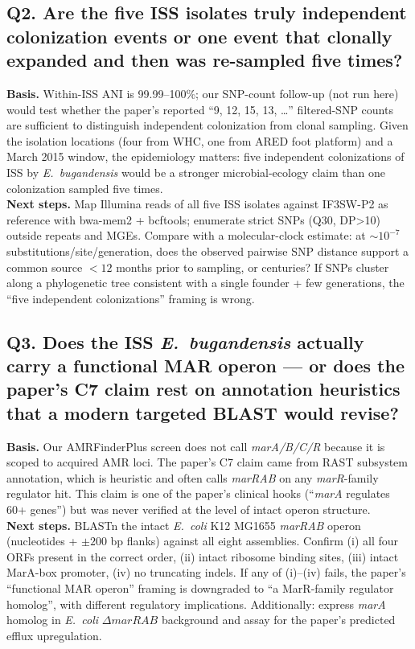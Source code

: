 \subsection*{Q2. Are the five ISS isolates truly independent colonization events or one
event that clonally expanded and then was re-sampled five times?}
\textbf{Basis.} Within-ISS ANI is 99.99--100\%; our SNP-count follow-up (not run here)
would test whether the paper's reported ``9, 12, 15, 13, \dots'' filtered-SNP counts are
sufficient to distinguish independent colonization from clonal sampling. Given the isolation
locations (four from WHC, one from ARED foot platform) and a March 2015 window, the
epidemiology matters: five independent colonizations of ISS by \emph{E.\ bugandensis} would
be a stronger microbial-ecology claim than one colonization sampled five times. \\
\textbf{Next steps.} Map Illumina reads of all five ISS isolates against IF3SW-P2 as
reference with bwa-mem2 + bcftools; enumerate strict SNPs (Q30, DP\textgreater 10) outside
repeats and MGEs. Compare with a molecular-clock estimate: at $\sim 10^{-7}$
substitutions/site/generation, does the observed pairwise SNP distance support a common
source $<12$ months prior to sampling, or centuries? If SNPs cluster along a phylogenetic
tree consistent with a single founder + few generations, the ``five independent
colonizations'' framing is wrong.

\subsection*{Q3. Does the ISS \emph{E.\ bugandensis} actually carry a functional MAR
operon --- or does the paper's C7 claim rest on annotation heuristics that a modern
targeted BLAST would revise?}
\textbf{Basis.} Our AMRFinderPlus screen does not call \emph{marA/B/C/R} because it is
scoped to acquired AMR loci. The paper's C7 claim came from RAST subsystem annotation,
which is heuristic and often calls \emph{marRAB} on any \emph{marR}-family regulator hit.
This claim is one of the paper's clinical hooks (``\emph{marA} regulates 60+ genes'') but
was never verified at the level of intact operon structure. \\
\textbf{Next steps.} BLASTn the intact \emph{E.\ coli} K12 MG1655 \emph{marRAB} operon
(nucleotides + $\pm 200$ bp flanks) against all eight assemblies. Confirm (i) all four ORFs
present in the correct order, (ii) intact ribosome binding sites, (iii) intact MarA-box
promoter, (iv) no truncating indels. If any of (i)--(iv) fails, the paper's ``functional
MAR operon'' framing is downgraded to ``a MarR-family regulator homolog'', with different
regulatory implications. Additionally: express \emph{marA} homolog in \emph{E.\ coli}
$\Delta marRAB$ background and assay for the paper's predicted efflux upregulation.

